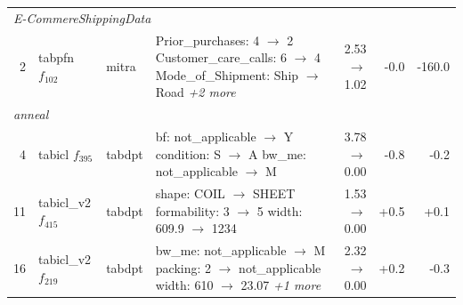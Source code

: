 \begin{table}[t]
\begin{tabularx}{\textwidth}{rllXrrr}
\midrule
\multicolumn{7}{l}{\textit{E-CommereShippingData}} \\
2 & tabpfn $f_{102}$ & mitra & \makecell[tl]{Prior\_purchases: 4 $\to$ 2 \\ Customer\_care\_calls: 6 $\to$ 4 \\ Mode\_of\_Shipment: Ship $\to$ Road \\ \textit{+2 more}} & 2.53 $\to$ 1.02 & -0.0 & -160.0 \\
\midrule
\multicolumn{7}{l}{\textit{anneal}} \\
4 & tabicl $f_{395}$ & tabdpt & \makecell[tl]{bf: not\_applicable $\to$ Y \\ condition: S $\to$ A \\ bw\_me: not\_applicable $\to$ M} & 3.78 $\to$ 0.00 & -0.8 & -0.2 \\
11 & tabicl\_v2 $f_{415}$ & tabdpt & \makecell[tl]{shape: COIL $\to$ SHEET \\ formability: 3 $\to$ 5 \\ width: 609.9 $\to$ 1234} & 1.53 $\to$ 0.00 & +0.5 & +0.1 \\
16 & tabicl\_v2 $f_{219}$ & tabdpt & \makecell[tl]{bw\_me: not\_applicable $\to$ M \\ packing: 2 $\to$ not\_applicable \\ width: 610 $\to$ 23.07 \\ \textit{+1 more}} & 2.32 $\to$ 0.00 & +0.2 & -0.3 \\
\bottomrule
\end{tabularx}
\end{table}
